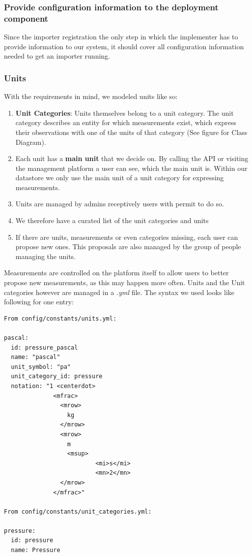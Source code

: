 \subsubsection{Provide configuration information to the deployment
component}\label{provide-configuration-information-to-the-deployment-component}

Since the importer registration the only step in which the implementer
has to provide information to our system, it should cover all
configuration information needed to get an importer running.

\subsubsection{Units}\label{units}

With the requirements in mind, we modeled units like so:

\begin{enumerate}
\def\labelenumi{\arabic{enumi}.}
\tightlist
\item
  \textbf{Unit Categories}: Units themselves belong to a unit category.
  The unit category describes an entity for which measurements exist,
  which express their observations with one of the units of that
  category (See figure for Class Diagram).
\item
  Each unit has a \textbf{main unit} that we decide on. By calling the
  API or visiting the management platform a user can see, which the main
  unit is. Within our datastore we only use the main unit of a unit
  category for expressing measurements.
\item
  Units are managed by admins receptively users with permit to do so.
\item
  We therefore have a curated list of the unit categories and units
\item
  If there are units, measurements or even categories missing, each user
  can propose new ones. This proposals are also managed by the group of
  people managing the units.
\end{enumerate}

Measurements are controlled on the platform itself to allow users to
better propose new measurements, as this may happen more often. Units
and the Unit categories however are managed in a \emph{.yml} file. The
syntax we used looks like following for one entry:

\begin{verbatim}
From config/constants/units.yml:

pascal:
  id: pressure_pascal
  name: "pascal"
  unit_symbol: "pa"
  unit_category_id: pressure
  notation: "1 <centerdot>
              <mfrac>
                <mrow>
                  kg
                </mrow>
                <mrow>
                  m
                  <msup>
                          <mi>s</mi>
                          <mn>2</mn>
                </mrow>
              </mfrac>"

From config/constants/unit_categories.yml:

pressure:
  id: pressure
  name: Pressure
\end{verbatim}

